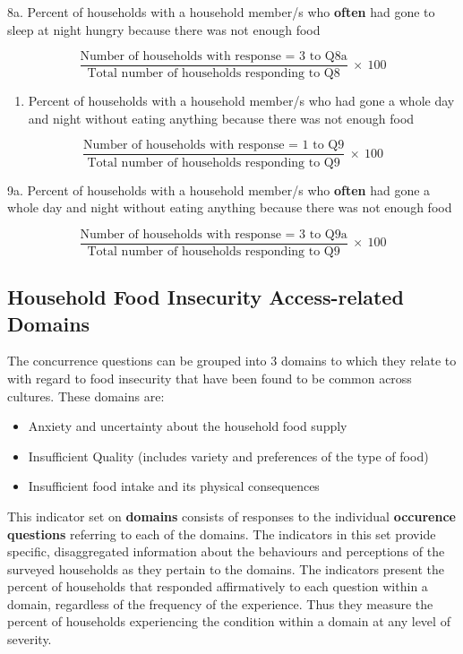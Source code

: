 \documentclass[12pt,]{book}
\providecommand{\tightlist}{%
  \setlength{\itemsep}{0pt}\setlength{\parskip}{0pt}}
\theoremstyle{definition}
\theoremstyle{definition}
\theoremstyle{definition}
\theoremstyle{remark}
\begin{document}
8a. Percent of households with a household member/s who \textbf{often}
had gone to sleep at night hungry because there was not enough food

\[ \frac{\text{Number of households with response = 3 to Q8a}}{\text{Total number of households responding to Q8}} ~ \times ~ 100 \]

\begin{enumerate}
\def\labelenumi{\arabic{enumi}.}
\setcounter{enumi}{8}
\tightlist
\item
  Percent of households with a household member/s who had gone a whole
  day and night without eating anything because there was not enough
  food
\end{enumerate}

\[ \frac{\text{Number of households with response = 1 to Q9}}{\text{Total number of households responding to Q9}} ~ \times ~ 100 \]

9a. Percent of households with a household member/s who \textbf{often}
had gone a whole day and night without eating anything because there was
not enough food

\[ \frac{\text{Number of households with response = 3 to Q9a}}{\text{Total number of households responding to Q9}} ~ \times ~ 100 \]

\hypertarget{household-food-insecurity-access-related-domains}{%
\subsection{Household Food Insecurity Access-related
Domains}\label{household-food-insecurity-access-related-domains}}

The concurrence questions can be grouped into 3 domains to which they
relate to with regard to food insecurity that have been found to be
common across cultures. These domains are:

\begin{itemize}
\item
  Anxiety and uncertainty about the household food supply
\item
  Insufficient Quality (includes variety and preferences of the type of
  food)
\item
  Insufficient food intake and its physical consequences
\end{itemize}

This indicator set on \textbf{domains} consists of responses to the
individual \textbf{occurence questions} referring to each of the
domains. The indicators in this set provide specific, disaggregated
information about the behaviours and perceptions of the surveyed
households as they pertain to the domains. The indicators present the
percent of households that responded affirmatively to each question
within a domain, regardless of the frequency of the experience. Thus
they measure the percent of households experiencing the condition within
a domain at any level of severity.
\end{document}
